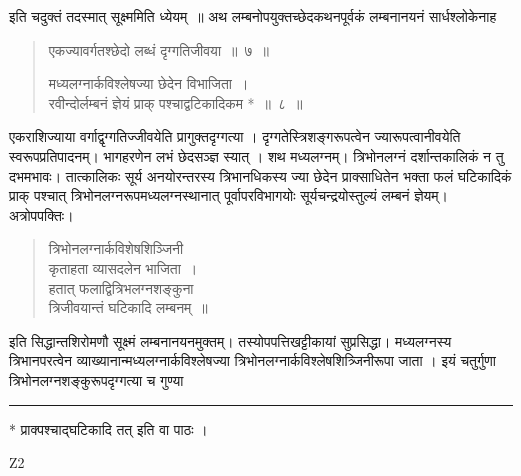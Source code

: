 \documentclass[11pt, openany]{book}
\begin{document}
\begin{sloppypar}
\noindent इति चदुक्तं तदस्मात् सूक्ष्ममिति ध्येयम्~॥ अथ लम्बनोपयुक्तच्छेदकथनपूर्वकं लम्बनानयनं सार्धश्लोकेनाह\textendash 
\end{sloppypar}


\begin{quote}
  {\ssi एकज्यावर्गतश्छेदो लब्धं दृग्गतिजीवया~॥~७~॥

 मध्यलग्नार्कविश्लेषज्या छेदेन विभाजिता~।\\
 रवीन्दोर्लम्बनं ज्ञेयं प्राक् पश्चाद्वटिकादिकम *~॥~८~॥}
 \end{quote}

\begin{sloppypar}
 एकराशिज्याया वर्गाद्वृग्गतिज्जीवयेति प्रागुक्तदृग्गत्या । दृग्गतेस्त्रिशङ्गरूपत्वेन ज्यारूपत्वानीवयेति स्वरूपप्रतिपादनम्। भागहरणेन लभं छेदसञ्ज्ञ स्यात् । शथ मध्यलग्नम्। त्रिभोनलग्नं दर्शान्तकालिकं न तु दभमभावः। तात्कालिकः सूर्य अनयोरन्तरस्य त्रिभानधिकस्य ज्या छेदेन प्राक्साधितेन भक्ता फलं घटिकादिकं प्राक् पश्चात् त्रिभोनलग्नरूपमध्यलग्नस्थानात् पूर्वापरविभागयोः सूर्यचन्द्रयोस्तुल्यं लम्बनं ज्ञेयम्। अत्रोपपक्तिः।
\end{sloppypar}


\begin{quote}
 {\qt त्रिभोनलग्नार्कविशेषशिञ्जिनी\\
 कृताहता व्यासदलेन भाजिता~।\\
 हतात् फलाद्वित्रिभलग्नशङ्कुना\\
 त्रिजीवयान्तं घटिकादि लम्बनम्~॥}
 \end{quote}

\begin{sloppypar}
\noindent इति सिद्धान्तशिरोमणौ सूक्ष्मं लम्बनानयनमुक्तम्। तस्योपपत्तिखट्टीकायां सुप्रसिद्धा। मध्यलग्नस्य त्रिभानपरत्वेन व्याख्यानान्मध्यलग्नार्कविश्लेषज्या त्रिभोनलग्नार्कविश्लेषशित्र्जिनीरूपा जाता । इयं चतुर्गुणा त्रिभोनलग्नशङ्कुरूपदृग्गत्या च गुण्या
\end{sloppypar}

\noindent \rule{\linewidth}{.5pt}

 \begin{center}
 * प्राक्पश्चाद्घटिकादि तत् इति वा पाठः ।
\end{center}
 {\tiny{Z2}}
 

\newpage
\end{document}
